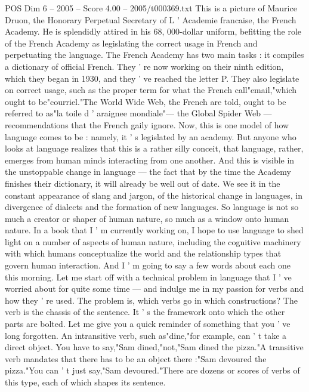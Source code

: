 \begin{textsample}{POS Dim 6 – 2005 – Score 4.00 – 2005/t000369.txt}  \label{ex:f6_pos_003}
This is a picture of Maurice Druon, the Honorary Perpetual Secretary of L ' Academie francaise, the French Academy.
He is splendidly attired in his 68, 000-dollar uniform, befitting the role of the French Academy as legislating the correct usage in French and perpetuating the language.
The French Academy has two main tasks : it compiles a dictionary of official French.
They ' re now working on their ninth edition, which they began in 1930, and they ' ve reached the letter P.
They also legislate on correct usage, such as the proper term for what the French call"email,"which ought to be"courriel."The World Wide Web, the French are told, ought to be referred to as"la toile d ' araignee mondiale"— the Global Spider Web — recommendations that the French gaily ignore.
Now, this is one model of how language comes to be : namely, it ' s legislated by an academy.
But anyone who looks at language realizes that this is a rather silly conceit, that language, rather, emerges from human minds interacting from one another.
And this is visible in the unstoppable change in language — the fact that by the time the Academy finishes their dictionary, it will already be well out of date.
We see it in the constant appearance of slang and jargon, of the historical change in languages, in divergence of dialects and the formation of new languages.
So language is not so much a creator or shaper of human nature, so much as a window onto human nature.
In a book that I ' m currently working on, I hope to use language to shed light on a number of aspects of human nature, including the cognitive machinery with which humans conceptualize the world and the relationship types that govern human interaction.
And I ' m going to say a few words about each one this morning.
Let me start off with a technical problem in language that I ' ve worried about for quite some time — and indulge me in my passion for verbs and how they ' re used.
The problem is, which verbs go in which constructions?
The verb is the chassis of the sentence.
It ' s the framework onto which the other parts are bolted.
Let me give you a quick reminder of something that you ' ve long forgotten.
An intransitive verb, such as"dine,"for example, can ' t take a direct object.
You have to say,"Sam dined,"not,"Sam dined the pizza."A transitive verb mandates that there has to be an object there :"Sam devoured the pizza."You can ' t just say,"Sam devoured."There are dozens or scores of verbs of this type, each of which shapes its sentence.

\end{textsample}

